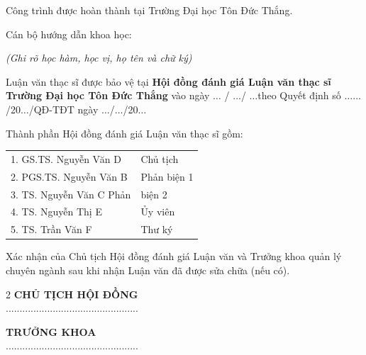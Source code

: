 Công trình được hoàn thành tại Trường Đại học Tôn Đức Thắng.

Cán bộ hướng dẫn khoa học: \dotfill

\hspace*{5.3cm}\dotfill

\noindent\hfill\textit{(Ghi rõ học hàm, học vị, họ tên và chữ ký)}\par\vspace{0.5cm}

Luận văn thạc sĩ được bảo vệ tại \textbf{Hội đồng đánh giá Luận văn thạc sĩ Trường Đại học Tôn Đức Thắng} vào ngày $\ldots$ / $\ldots$/ $\ldots$theo Quyết định số $\ldots\ldots$/20$\ldots$/QĐ-TĐT ngày
$\ldots$/$\ldots$/20$\ldots$\vspace{0.5cm}

Thành phần Hội đồng đánh giá Luận văn thạc sĩ gồm:

\begin{tabular}{p{9cm}l}
	1. GS.TS. Nguyễn Văn D& Chủ tịch\\
	2. PGS.TS. Nguyễn Văn B& Phản biện 1\\
	3. TS. Nguyễn Văn C Phản& biện 2\\
	4. TS. Nguyễn Thị E& Ủy viên\\
	5. TS. Trần Văn F& Thư ký\\
\end{tabular}
\vspace*{1cm}

Xác nhận của Chủ tịch Hội đồng đánh giá Luận văn và Trưởng khoa quản lý chuyên ngành sau khi nhận Luận văn đã được sửa chữa (nếu có).
\vspace*{1cm}
\begin{multicols}{2}
	\centering
	\textbf{CHỦ TỊCH HỘI ĐỒNG}\\[3cm]
	................................................
	
	\textbf{TRƯỞNG KHOA}\\[3cm]
	................................................
\end{multicols}

\newpage